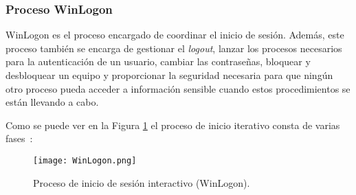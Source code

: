 \subsubsection{Proceso WinLogon}

WinLogon es el proceso encargado de coordinar el inicio de sesión. Además, este proceso también se encarga de gestionar el {\it logout}, lanzar los procesos necesarios para la autenticación de un usuario, cambiar las contraseñas, bloquear y desbloquear un equipo y proporcionar la seguridad necesaria para que ningún otro proceso pueda acceder a información sensible cuando estos procedimientos se están llevando a cabo. 

Como se puede ver en la Figura \ref{WinLogon} el proceso de inicio iterativo consta de varias fases~\cite{Capitulo2:WinInternals}:

\begin{figure}[t!] %
\begin{center}
\texttt{[image: WinLogon.png]}
\end{center}
\caption{Proceso de inicio de sesión interactivo (WinLogon).}
\label{WinLogon}
\end{figure}

